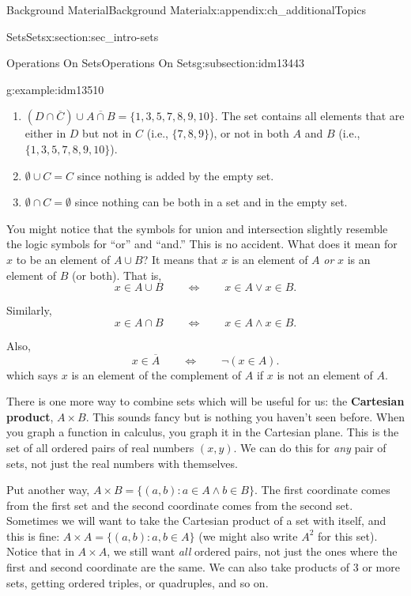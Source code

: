 \documentclass[oneside,10pt,]{book}
\newcommand{\terminology}[1]{\textbf{#1}}
\numberwithin{equation}{chapter}
\def\st{:}
\def\Iff{\Leftrightarrow}
\begin{document}
\begin{appendixptx}{Background Material}{}{Background Material}{}{}{x:appendix:ch_additionalTopics}
\begin{sectionptx}{Sets}{}{Sets}{}{}{x:section:sec_intro-sets}
\begin{subsectionptx}{Operations On Sets}{}{Operations On Sets}{}{}{g:subsection:idm13443}
\begin{example}{}{g:example:idm13510}
\begin{enumerate}
\item{}\((D \cap \overline C) \cup \overline{A \cap B} = \{1, 3, 5, 7, 8, 9, 10\}.\) The set contains all elements that are either in \(D\) but not in \(C\) (i.e., \(\{7,8,9\}\)), or not in both \(A\) and \(B\) (i.e., \(\{1,3,5,7,8,9,10\}\)).%
\item{}\(\emptyset \cup C = C\) since nothing is added by the empty set.%
\item{}\(\emptyset \cap C = \emptyset\) since nothing can be both in a set and in the empty set.%
\end{enumerate}
%
\end{example}
You might notice that the symbols for union and intersection slightly resemble the logic symbols for ``or'' and ``and.'' This is no accident. What does it mean for \(x\) to be an element of \(A\cup B\)? It means that \(x\) is an element of \(A\) \emph{or} \(x\) is an element of \(B\) (or both). That is,%
\begin{equation*}
x \in A \cup B \qquad \Iff \qquad x \in A \vee x \in B.
\end{equation*}
%
\par
Similarly,%
\begin{equation*}
x \in A \cap B \qquad \Iff \qquad x \in A \wedge x \in B.
\end{equation*}
%
\par
Also,%
\begin{equation*}
x \in \overline A \qquad \Iff \qquad \neg (x \in A).
\end{equation*}
which says \(x\) is an element of the complement of \(A\) if \(x\) is not an element of \(A\).%
\par
There is one more way to combine sets which will be useful for us: the \terminology{Cartesian product}, \(A \times B\)\label{g:notation:idm13600}. This sounds fancy but is nothing you haven't seen before. When you graph a function in calculus, you graph it in the Cartesian plane. This is the set of all ordered pairs of real numbers \((x,y)\). We can do this for \emph{any} pair of sets, not just the real numbers with themselves.%
\par
Put another way, \(A \times B = \{(a,b) \st a \in A \wedge b \in B\}\). The first coordinate comes from the first set and the second coordinate comes from the second set. Sometimes we will want to take the Cartesian product of a set with itself, and this is fine: \(A \times A = \{(a,b) \st a, b \in A\}\) (we might also write \(A^2\) for this set). Notice that in \(A \times A\), we still want \emph{all} ordered pairs, not just the ones where the first and second coordinate are the same. We can also take products of 3 or more sets, getting ordered triples, or quadruples, and so on.%

\end{subsectionptx}
\end{sectionptx}
\end{appendixptx}
\end{document}
